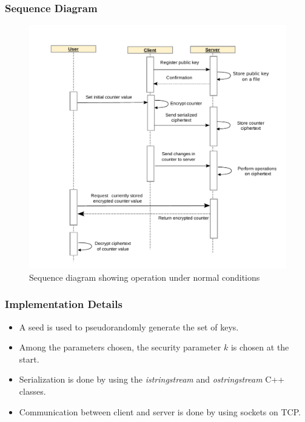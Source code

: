 \documentclass{beamer}
\begin{document}
\begin{frame}
\frametitle{Sequence Diagram}

\begin{figure}[H]
  \centering
  \includegraphics[scale=0.35]{../img/counter}
  \caption{Sequence diagram showing operation under normal conditions}
  \label{fig:seqdiag}
\end{figure}
\end{frame}

\begin{frame}
\frametitle{Implementation Details}
\begin{itemize}
  \setlength\itemsep{1.5em}
\item A seed is used to pseudorandomly generate the set of keys.
\item Among the parameters chosen, the security parameter $k$ is chosen at the start.
\item Serialization is done by using the \emph{istringstream} and \emph{ostringstream} C++ classes.
\item Communication between client and server is done by using sockets on TCP.
\end{itemize}
\end{frame}

\end{document}
